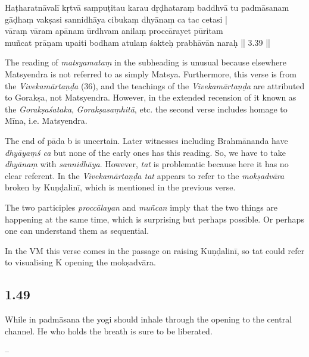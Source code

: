 \begin{ekdosis}
\begin{testimonia}[hp01_048]
Haṭharatnāvalī
\startverse
kṛtvā saṃpuṭitau karau dṛḍhataraṃ baddhvā tu padmāsanam\\
gāḍhaṃ vakṣasi sannidhāya cibukaṃ dhyānaṃ ca tac cetasi |\\
vāraṃ vāram apānam ūrdhvam anilaṃ proccārayet pūritam\\
muñcat prāṇam upaiti bodham atulaṃ śakteḥ prabhāvān naraḥ || 3.39 ||
\endverse
\end{testimonia}

\begin{philcomm}[hp01_048]
The reading of \emph{matsyamataṃ} in the subheading is unusual because elsewhere Matsyendra is not referred to as simply Matsya. Furthermore, this verse is from the \emph{Vivekamārtaṇḍa} (36), and the teachings of the \emph{Vivekamārtaṇḍa} are attributed to Gorakṣa, not Matsyendra. However, in the extended recension of it known as the  \emph{Gorakṣaśataka},  \emph{Gorakṣasaṃhitā}, etc. the second verse includes homage to Mīna, i.e. Matsyendra.

The end of pāda b is uncertain. Later witnesses including Brahmānanda have \emph{dhyāyaṃś ca} but none of the early ones has this reading. So, we have to take \emph{dhyānaṃ} with \emph{sannidhāya}. However, \emph{tat} is problematic because here it has no clear referent. In the \emph{Vivekamārtaṇḍa tat} appears to refer to the \emph{mokṣadvāra} broken by Kuṇḍalinī, which is mentioned in the previous verse.

The two participles \emph{proccālayan} and \emph{muñcan} imply that the two things are happening at the same time, which is surprising but perhaps possible. Or perhaps one can understand them as sequential.

In the VM this verse comes in the passage on raising Kuṇḍalinī, so tat could refer to visualising K opening the mokṣadvāra.
\end{philcomm}

\subsection*{1.49}
\begin{translation}[hp01_049]
While in padmāsana the yogi should inhale through the opening to the central channel. He who holds the breath is sure to be liberated.
\end{translation}

\begin{sources}[hp01_049]
--
\end{sources}


\end{ekdosis}
